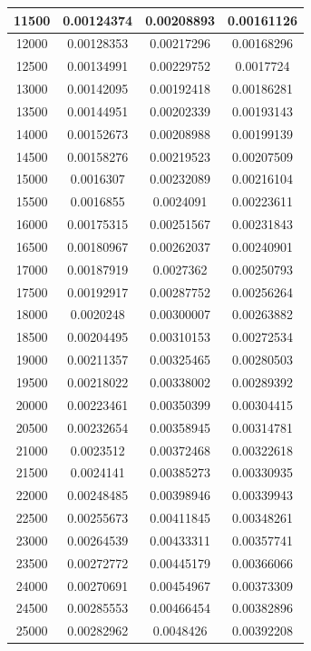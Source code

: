 \documentclass{article}
\begin{document}
\begin{longtable}{|c|c|c|c|}
			11500	 &  0.00124374	 &  0.00208893	 &  0.00161126  \\ \hline
			12000	 &  0.00128353	 &  0.00217296	 &  0.00168296  \\ \hline
			12500	 &  0.00134991	 &  0.00229752	 &  0.0017724  \\ \hline
			13000	 &  0.00142095	 &  0.00192418	 &  0.00186281  \\ \hline
			13500	 &  0.00144951	 &  0.00202339	 &  0.00193143  \\ \hline
			14000	 &  0.00152673	 &  0.00208988	 &  0.00199139  \\ \hline
			14500	 &  0.00158276	 &  0.00219523	 &  0.00207509  \\ \hline
			15000	 &  0.0016307	 &  0.00232089	 &  0.00216104  \\ \hline
			15500	 &  0.0016855	 &  0.0024091	 &  0.00223611  \\ \hline
			16000	 &  0.00175315	 &  0.00251567	 &  0.00231843  \\ \hline
			16500	 &  0.00180967	 &  0.00262037	 &  0.00240901  \\ \hline
			17000	 &  0.00187919	 &  0.0027362	 &  0.00250793  \\ \hline
			17500	 &  0.00192917	 &  0.00287752	 &  0.00256264  \\ \hline
			18000	 &  0.0020248	 &  0.00300007	 &  0.00263882  \\ \hline
			18500	 &  0.00204495	 &  0.00310153	 &  0.00272534  \\ \hline
			19000	 &  0.00211357	 &  0.00325465	 &  0.00280503  \\ \hline
			19500	 &  0.00218022	 &  0.00338002	 &  0.00289392  \\ \hline
			20000	 &  0.00223461	 &  0.00350399	 &  0.00304415  \\ \hline
			20500	 &  0.00232654	 &  0.00358945	 &  0.00314781  \\ \hline
			21000	 &  0.0023512	 &  0.00372468	 &  0.00322618  \\ \hline
			21500	 &  0.0024141	 &  0.00385273	 &  0.00330935  \\ \hline
			22000	 &  0.00248485	 &  0.00398946	 &  0.00339943  \\ \hline
			22500	 &  0.00255673	 &  0.00411845	 &  0.00348261  \\ \hline
			23000	 &  0.00264539	 &  0.00433311	 &  0.00357741  \\ \hline
			23500	 &  0.00272772	 &  0.00445179	 &  0.00366066  \\ \hline
			24000	 &  0.00270691	 &  0.00454967	 &  0.00373309  \\ \hline
			24500	 &  0.00285553	 &  0.00466454	 &  0.00382896  \\ \hline
			25000	 &  0.00282962	 &  0.0048426	 &  0.00392208  \\ \hline
		\end{longtable}
\end{document}
